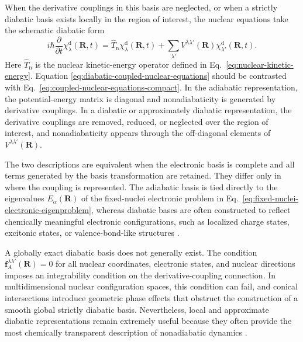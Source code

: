 \documentclass[
  11pt,
  letterpaper,
  onehalfspacing,
  normalmargins,
  equalmargins,
  oneside
]{ut-thesis}
\begin{document}
When the derivative couplings in this basis are neglected, or when a strictly
diabatic basis exists locally in the region of interest, the nuclear equations
take the schematic diabatic form
\begin{equation}
i\hbar
\frac{\partial}{\partial t}
\chi_\lambda^{\mathrm d}(\mathbf R,t)
=
\hat T_{\mathrm n}\chi_\lambda^{\mathrm d}(\mathbf R,t)
+
\sum_{\lambda'}
V^{\lambda\lambda'}(\mathbf R)\chi_{\lambda'}^{\mathrm d}(\mathbf R,t).
\label{eq:diabatic-coupled-nuclear-equations}
\end{equation}
Here \(\hat T_{\mathrm n}\) is the nuclear kinetic-energy operator defined in
Eq.~\eqref{eq:nuclear-kinetic-energy}. Equation
\eqref{eq:diabatic-coupled-nuclear-equations} should be contrasted with
Eq.~\eqref{eq:coupled-nuclear-equations-compact}. In the adiabatic
representation, the potential-energy matrix is diagonal and nonadiabaticity is
generated by derivative couplings. In a diabatic or approximately diabatic
representation, the derivative couplings are removed, reduced, or neglected
over the region of interest, and nonadiabaticity appears through the
off-diagonal elements of \(V^{\lambda\lambda'}(\mathbf R)\).

The two descriptions are equivalent when the electronic basis is complete and
all terms generated by the basis transformation are retained. They differ only
in where the coupling is represented. The adiabatic basis is tied directly to
the eigenvalues \(E_\alpha(\mathbf R)\) of the fixed-nuclei electronic problem
in Eq.~\eqref{eq:fixed-nuclei-electronic-eigenproblem}, whereas diabatic bases
are often constructed to reflect chemically meaningful electronic
configurations, such as localized charge states, excitonic states, or
valence-bond-like structures
\cite{Subotnik2009JCP,Subotnik2015AccChemRes}.

A globally exact diabatic basis does not generally exist. The condition
\(\mathbf f_A^{\lambda\lambda'}(\mathbf R)=0\) for all nuclear coordinates,
electronic states, and nuclear directions imposes an integrability condition
on the derivative-coupling connection. In multidimensional nuclear
configuration spaces, this condition can fail, and conical intersections
introduce geometric phase effects that obstruct the construction of a smooth
global strictly diabatic basis. Nevertheless, local and approximate diabatic
representations remain extremely useful because they often provide the most
chemically transparent description of nonadiabatic dynamics
\cite{KoppelDomckeCederbaum1984,MeadTruhlar1982,Yarkony1996RMP,DomckeYarkonyKoppel2004}.
\end{document}

